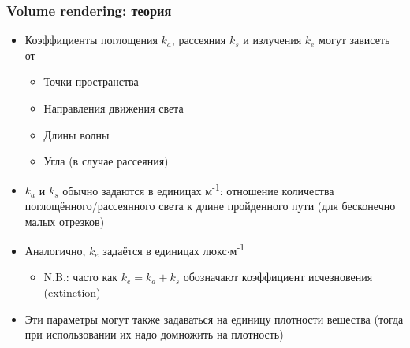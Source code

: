 \documentclass[10pt]{beamer}
\begin{document}
\begin{frame}[fragile]
\frametitle{Volume rendering: теория}
\begin{itemize}
\item Коэффициенты поглощения \begin{math}k_a\end{math}, рассеяния \begin{math}k_s\end{math} и излучения \begin{math}k_e\end{math} могут зависеть от
\pause
\begin{itemize}
\item Точки пространства
\pause
\item Направления движения света
\pause
\item Длины волны
\pause
\item Угла (в случае рассеяния)
\end{itemize}
\pause
\item \begin{math}k_a\end{math} и \begin{math}k_s\end{math} обычно задаются в единицах м\textsuperscript{-1}: отношение количества поглощённого/рассеянного света к длине пройденного пути (для бесконечно малых отрезков)
\pause
\item Аналогично, \begin{math}k_e\end{math} задаётся в единицах люкс\begin{math}\cdot\end{math}м\textsuperscript{-1}
\pause
\begin{itemize}
\item N.B.: часто как \begin{math}k_e = k_a + k_s\end{math} обозначают коэффициент исчезновения (extinction)
\end{itemize}
\pause
\item Эти параметры могут также задаваться на единицу плотности вещества (тогда при использовании их надо домножить на плотность)
\end{itemize}
\end{frame}
\end{document}
